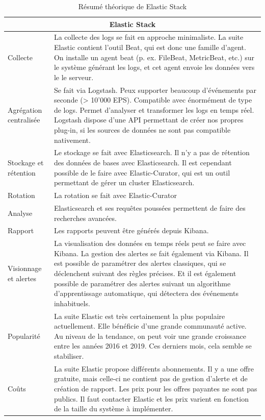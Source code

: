 \documentclass[paper=a4, fontsize=11pt]{scrartcl}
\begin{document}
\centering
\begin{table}[H]
\begin{tabular}{ |p{4cm}||p{12cm}|  }
    \hline
    \multicolumn{2}{|c|}{Elastic Stack} \\
    \hline
    Collecte & La collecte des logs se fait en approche minimaliste. La suite Elastic contient l'outil Beat, qui est donc une famille d'agent. On installe un agent beat (p. ex. FileBeat, MetricBeat, etc.) sur le système générant les logs, et cet agent envoie les données vers le le serveur.\\
    \hline
    Agrégation centralisée & Se fait via Logstash. Peux supporter beaucoup d'événements par seconde (> 10'000 EPS). Compatible avec énormément de type de logs. Permet d'analyser et transformer les logs en temps réel. Logstash dispose d'une API permettant de créer nos propres plug-in, si les sources de données ne sont pas compatible nativement.\\
    \hline
    Stockage et rétention & Le stockage se fait avec Elasticsearch. Il n'y a pas de rétention des données de bases avec Elasticsearch. Il est cependant possible de le faire avec Elastic-Curator, qui est un outil permettant de gérer un cluster Elasticsearch.\\
    \hline
    Rotation & La rotation se fait avec Elastic-Curator\\
    \hline
    Analyse & Elasticsearch et ses requêtes poussées permettent de faire des recherches avancées.\\
    \hline
    Rapport & Les rapports peuvent être générés depuis Kibana.\\
    \hline
    Visionnage et alertes & La visualisation des données en temps réels peut se faire avec Kibana. La gestion des alertes se fait également via Kibana. Il est possible de paramétrer des alertes classiques, qui se déclenchent suivant des règles précises. Et il est également possible de paramétrer des alertes suivant un algorithme d'apprentissage automatique, qui détectera des événements inhabituels.\\
    \hline
    Popularité & La suite Elastic est très certainement la plus populaire actuellement. Elle bénéficie d'une grande communauté active. Au niveau de la tendance, on peut voir une grande croissance entre les années 2016 et 2019. Ces derniers mois, cela semble se stabiliser.\\
    \hline
    Coûts &  La suite Elastic propose différents abonnements. Il y a une offre gratuite, mais celle-ci ne contient pas de gestion d'alerte et de création de rapport. Les prix pour les offres payantes ne sont pas publics. Il faut contacter Elastic et les prix varient en fonction de la taille du système à implémenter.\\
    \hline
\end{tabular}
\caption{Résumé théorique de Elastic Stack}
\label{t-resumeELK}
\end{table}
\justify
\end{document}

